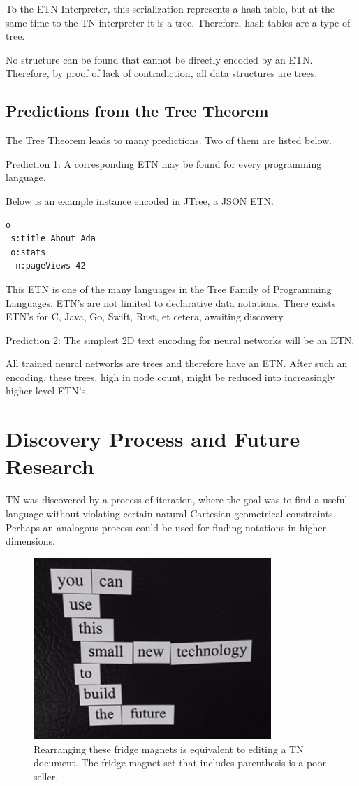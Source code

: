 \documentclass[journal]{IEEEtran}
\begin{document}
To the ETN Interpreter, this serialization represents a hash table, but at the same time to the TN interpreter it is a tree. Therefore, hash tables are a type of tree.

No structure can be found that cannot be directly encoded by an ETN. Therefore, by proof of lack of contradiction, all data structures are trees.

\subsection{Predictions from the Tree Theorem}

The Tree Theorem leads to many predictions. Two of them are listed below.

Prediction 1: A corresponding ETN may be found for every programming language.

Below is an example instance encoded in JTree, a JSON ETN.

\begin{lstlisting}
o
 s:title About Ada
 o:stats
  n:pageViews 42
\end{lstlisting}

This ETN is one of the many languages in the Tree Family of Programming Languages. ETN's are not limited to declarative data notations. There exists ETN's for C, Java, Go, Swift, Rust, et cetera, awaiting discovery.

Prediction 2: The simplest 2D text encoding for neural networks will be an ETN.

All trained neural networks are trees and therefore have an ETN. After such an encoding, these trees, high in node count, might be reduced into increasingly higher level ETN's.

\section{Discovery Process and Future Research}

TN was discovered by a process of iteration, where the goal was to find a useful language without violating certain natural Cartesian geometrical constraints. Perhaps an analogous process could be used for finding notations in higher dimensions.

\begin{figure}[ht!]
\centering
\includegraphics[width=90mm]{tree.jpg}
\caption{Rearranging these fridge magnets is equivalent to editing a TN document. The fridge magnet set that includes parenthesis is a poor seller.}
\end{figure}
\end{document}
